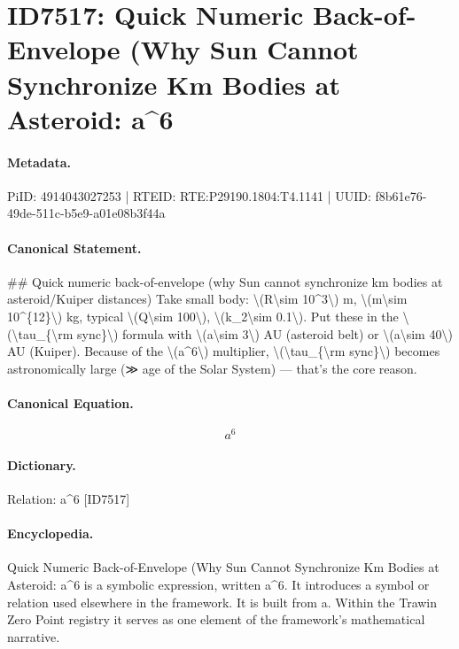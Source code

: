 \section*{ID7517: Quick Numeric Back-of-Envelope (Why Sun Cannot Synchronize Km Bodies at Asteroid: a\textasciicircum{}6}
\paragraph{Metadata.}
PiID: 4914043027253 | RTEID: RTE:P29190.1804:T4.1141 | UUID: f8b61e76-49de-511c-b5e9-a01e08b3f44a

\paragraph{Canonical Statement.}
\#\# Quick numeric back-of-envelope (why Sun cannot synchronize km bodies at asteroid/Kuiper distances) Take small body: \textbackslash{}(R\textbackslash{}sim 10\textasciicircum{}3\textbackslash{}) m, \textbackslash{}(m\textbackslash{}sim 10\textasciicircum{}\{12\}\textbackslash{}) kg, typical \textbackslash{}(Q\textbackslash{}sim 100\textbackslash{}), \textbackslash{}(k\_2\textbackslash{}sim 0.1\textbackslash{}). Put these in the \textbackslash{}(\textbackslash{}tau\_\{\textbackslash{}rm sync\}\textbackslash{}) formula with \textbackslash{}(a\textbackslash{}sim 3\textbackslash{}) AU (asteroid belt) or \textbackslash{}(a\textbackslash{}sim 40\textbackslash{}) AU (Kuiper). Because of the \textbackslash{}(a\textasciicircum{}6\textbackslash{}) multiplier, \textbackslash{}(\textbackslash{}tau\_\{\textbackslash{}rm sync\}\textbackslash{}) becomes astronomically large (≫ age of the Solar System) — that’s the core reason.

\paragraph{Canonical Equation.}
\[
a^6
\]

\paragraph{Dictionary.}
Relation: a\textasciicircum{}6 [ID7517]

\paragraph{Encyclopedia.}
Quick Numeric Back-of-Envelope (Why Sun Cannot Synchronize Km Bodies at Asteroid: a\textasciicircum{}6 is a symbolic expression, written a\textasciicircum{}6. It introduces a symbol or relation used elsewhere in the framework. It is built from a. Within the Trawin Zero Point registry it serves as one element of the framework's mathematical narrative.
